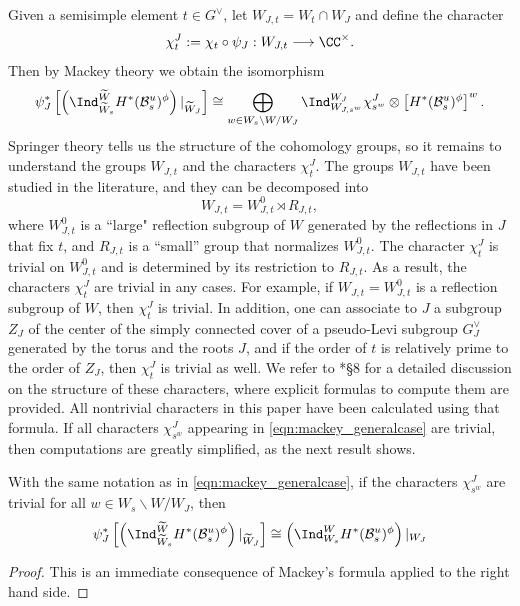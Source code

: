 Given a semisimple element $t\in G^\vee$, let $W_{J,t}=W_t\cap W_J$ and define the character
\begin{equation}
    \chi_t^J:=\chi_t\circ\psi_J:W_{J,t}\longrightarrow\CC^\times.
\end{equation}
Then by Mackey theory we obtain the isomorphism
\begin{equation}\label{eqn:mackey_generalcase}
    \psi_J^*\left[\left(\Ind_{\widetilde{W}_s}^{\widetilde{W}}H^*(\mathcal{B}^u_s)^\phi\right)|_{\widetilde{W}_J}\right]\cong\bigoplus_{w\in W_s\backslash W/W_J}\Ind_{W_{J,s^w}}^{W_J}\chi_{s^w}^J\otimes\left[H^*(\mathcal{B}^u_s)^\phi\right]^w.
\end{equation}
Springer theory tells us the structure of the cohomology groups, so it remains to understand the groups $W_{J,t}$ and the characters $\chi_t^J$. The groups $W_{J,t}$ have been studied in the literature, and they can be decomposed into 
$$W_{J,t}=W_{J,t}^0\rtimes R_{J,t},$$
where $W_{J,t}^0$ is a ``large" reflection subgroup of $W$ generated by the reflections in $J$ that fix $t$, and $R_{J,t}$ is a ``small'' group that normalizes $W_{J,t}^0$. The character $\chi_t^J$ is trivial on $W_{J,t}^0$ and is determined by its restriction to $R_{J,t}$. As a result, the characters $\chi_t^J$ are trivial in any cases. For example, if $W_{J,t}=W_{J,t}^0$ is a reflection subgroup of $W$, then $\chi_t^J$ is trivial. In addition, one can associate to $J$ a subgroup $Z_J$ of the center of the simply connected cover of a pseudo-Levi subgroup $G^\vee_J$ generated by the torus and the roots $J$, and if the order of $t$ is relatively prime to the order of $Z_J$, then $\chi_t^J$ is trivial as well. We refer to \cite{Reeder2000}*{\S 8} for a detailed discussion on the structure of these characters, where explicit formulas to compute them are provided. All nontrivial characters in this paper have been calculated using that formula. If all characters $\chi_{s^w}^{J}$ appearing in \eqref{eqn:mackey_generalcase} are trivial, then computations are greatly simplified, as the next result shows.
\begin{lemma}\label{lem:mackey_restriction}
    With the same notation as in \eqref{eqn:mackey_generalcase}, if the characters $\chi_{s^w}^{J}$ are trivial for all $w\in W_s\backslash W/W_J$, then
    $$\psi_J^*\left[\left(\Ind_{\widetilde{W}_s}^{\widetilde{W}}H^*(\mathcal{B}^u_s)^\phi\right)|_{\widetilde{W}_J}\right]\cong\left(\Ind_{W_s}^W H^*(\mathcal{B}^u_s)^\phi\right)|_{W_J}$$
\end{lemma}
\begin{proof}
    This is an immediate consequence of Mackey's formula applied to the right hand side.
\end{proof}

